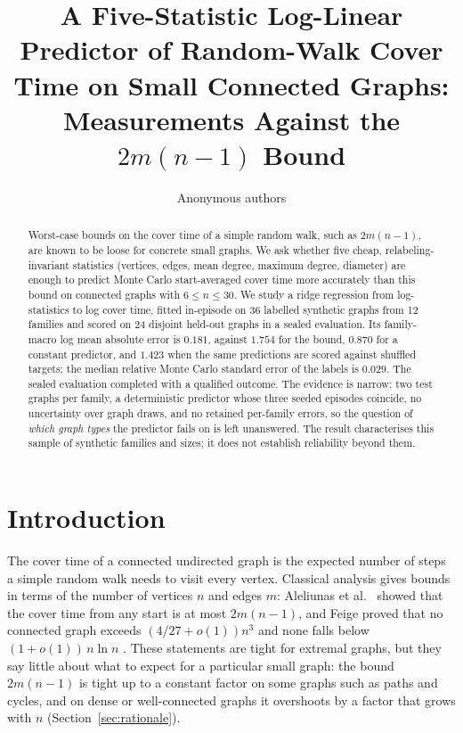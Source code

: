 \documentclass{article}
\title{A Five-Statistic Log-Linear Predictor of Random-Walk Cover Time on Small Connected Graphs: Measurements Against the $2m(n-1)$ Bound}
\author{Anonymous authors}
\begin{document}
\maketitle

\begin{abstract}
Worst-case bounds on the cover time of a simple random walk, such as $2m(n-1)$, are known to be loose for concrete small graphs. We ask whether five cheap, relabeling-invariant statistics (vertices, edges, mean degree, maximum degree, diameter) are enough to predict Monte Carlo start-averaged cover time more accurately than this bound on connected graphs with $6\le n\le 30$. We study a ridge regression from log-statistics to log cover time, fitted in-episode on 36 labelled synthetic graphs from 12 families and scored on 24 disjoint held-out graphs in a sealed evaluation. Its family-macro log mean absolute error is $0.181$, against $1.754$ for the bound, $0.870$ for a constant predictor, and $1.423$ when the same predictions are scored against shuffled targets; the median relative Monte Carlo standard error of the labels is $0.029$. The sealed evaluation completed with a qualified outcome. The evidence is narrow: two test graphs per family, a deterministic predictor whose three seeded episodes coincide, no uncertainty over graph draws, and no retained per-family errors, so the question of \emph{which graph types} the predictor fails on is left unanswered. The result characterises this sample of synthetic families and sizes; it does not establish reliability beyond them.
\end{abstract}

\section{Introduction}
The cover time of a connected undirected graph is the expected number of steps a simple random walk needs to visit every vertex. Classical analysis gives bounds in terms of the number of vertices $n$ and edges $m$: Aleliunas et al.\ \citep{Aleliunas1979RandomWU} showed that the cover time from any start is at most $2m(n-1)$, and Feige proved that no connected graph exceeds $(4/27+o(1))n^3$ and none falls below $(1+o(1))\,n\ln n$ \citep{Feige1995ATU,Feige1995ATL}. These statements are tight for extremal graphs, but they say little about what to expect for a particular small graph: the bound $2m(n-1)$ is tight up to a constant factor on some graphs such as paths and cycles, and on dense or well-connected graphs it overshoots by a factor that grows with $n$ (Section~\ref{sec:rationale}).
\end{document}

